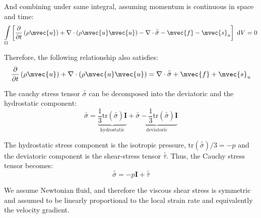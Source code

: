 And combining under same integral, assuming momentum is continuous in space and time:
\begin{equation}
\int \limits_\Omega \left[ \frac{\partial}{\partial t} \left(\rho \mvec{u} \right) + \nabla \cdot \left(\rho \mvec{u}\mvec{u} \right) - \nabla \cdot \bar{\bar{{\sigma}}} - \mvec{f} -  \mvec{s}_{u} \right]\; \mathrm{d}V = 0
\end{equation}

Therefore, the following relationship also satisfies:
\begin{equation}
\frac{\partial}{\partial t} \left(\rho \mvec{u} \right) + \nabla \cdot \left(\rho \mvec{u}\mvec{u} \right) = \nabla \cdot \bar{\bar{{\sigma}}} +  \mvec{f} +  \mvec{s}_{u}
\end{equation}

The cauchy stress tensor $\bar{\bar{{\sigma}}}$ can be decomposed into the deviatoric and the hydrostatic component:
\begin{equation}
\bar{\bar{{\sigma}}} =  \underbrace{ \frac{1}{3}\mathrm{tr}\left(\bar{\bar{{\sigma}}}\right) \textbf{I} }_\text{hydrostatic}  + \underbrace{ \bar{\bar{{\sigma}}} - \frac{1}{3}\mathrm{tr}\left(\bar{\bar{{\sigma}}} \right)\textbf{I} }_\text{deviatoric}
\end{equation}

The hydrostatic stress component is the isotropic pressure, $\mathrm{tr}\left(\bar{\bar{{\sigma}}} \right)/3 = -p$ and the deviatoric component is the shear-stress tensor $\bar{\bar{{\tau}}}$. Thus, the Cauchy stress tensor becomes:
\begin{equation}
\bar{\bar{\sigma}} = -p\textbf{I} + \bar{\bar{{\tau}}}
\end{equation}

\begin{assumption}
	We assume Newtonian fluid, and therefore the viscous shear stress is symmetric and assumed to be linearly proportional to the local strain rate and equivalently the velocity gradient. 
\end{assumption}

